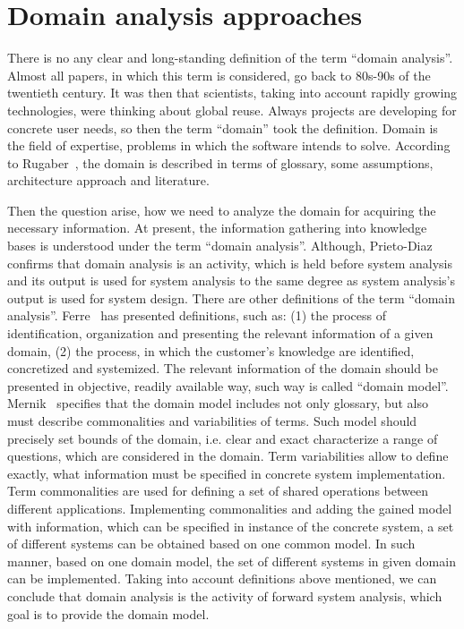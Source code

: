 \documentclass[conference]{IEEEtran}
\begin{document}
\section{Domain analysis approaches}
\label{chapter:approaches}
There is no any clear and long-standing definition of the term ``domain analysis''. Almost all papers, in which this term is considered, go back to 80s-90s of the twentieth century. It was then that scientists, taking into account rapidly growing technologies, were thinking about global reuse. Always projects are developing for concrete user needs, so then the term ``domain'' took the definition. Domain is the field of expertise, problems in which the software intends to solve. According to Rugaber~\cite{rugaber1994domain}, the domain is described in terms of glossary, some assumptions, architecture approach and literature. 

Then the question arise, how we need to analyze the domain for acquiring the necessary information. At present, the information gathering into knowledge bases is understood under the term ``domain analysis''. Although, Prieto-Diaz~\cite{prieto1988domain} confirms that domain analysis is an activity, which is held before system analysis and its output is used for system analysis to the same degree as system analysis’s output is used for system design.  There are other definitions of the term ``domain analysis''. Ferre~\cite{ferre1999evaluation} has presented definitions, such as: (1) the process of identification, organization and presenting the relevant information of a given domain, (2) the process, in which the customer’s knowledge are identified, concretized and systemized. The relevant information of the domain should be presented in objective, readily available way, such way is called ``domain model''. Mernik~\cite{mernik2005} specifies that the domain model includes not only glossary, but also must describe commonalities and variabilities of terms. Such model should precisely set bounds of the domain, i.e. clear and exact characterize a range of questions, which are considered in the domain. Term variabilities allow to define exactly, what information must be specified in concrete system implementation. Term commonalities are used for defining a set of shared operations between different applications. Implementing commonalities and adding the gained model  with information, which can be specified in instance of the concrete system, a set of different systems can be obtained based on one common model. In such manner, based on one domain model, the set of different systems in given domain can be implemented. Taking into account definitions above mentioned, we can conclude that domain analysis is the activity of forward system analysis, which goal is to provide the domain model. 
\end{document}
